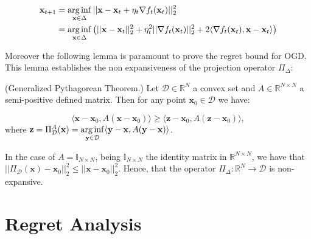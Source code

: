 \begin{align}
	\mathbf x_{t+1}&=\operatorname*{arg\,inf}\limits_{\mathbf x\in\Delta}||\mathbf x-\mathbf x_t+\eta_t\nabla f_t(\mathbf x_t)||_2^2\\
	&=\operatorname*{arg\,inf}\limits_{\mathbf x\in\Delta}\left(||\mathbf x-\mathbf x_t||_2^2+\eta_t^2||\nabla f_t(\mathbf x_t)||_2^2+2\langle\nabla f_t(\mathbf x_t),\mathbf x-\mathbf x_t\rangle\right)
\end{align}


Moreover the following lemma is paramount to prove the regret bound for OGD. This lemma establishes the non expansiveness of the projection operator $\Pi_\Delta$:

\begin{lemma}(Generalized Pythagorean Theorem.)\label{lemma:non_expansive}
Let $\mathcal D\in\mathbb R^N$ a convex set and $A\in\mathbb R^{N\times N}$ a semi-positive defined matrix. Then for any point $\mathbf x_0\in\mathcal D$ we have:

\begin{equation}
\langle\mathbf x-\mathbf x_0,A(\mathbf x-\mathbf x_0) \rangle\ge\langle\mathbf z-\mathbf x_0,A(\mathbf z-\mathbf x_0)\rangle,
\end{equation}
where $\mathbf z=\Pi_{\mathcal D}^A(\mathbf x)=\operatorname*{arg\,inf}\limits_{\mathbf y\in\mathcal D}\langle\mathbf y-\mathbf x,A(\mathbf y-\mathbf x)\rangle$.
\end{lemma}

In the case of $A=\mathbb I_{N\times N}$, being $\mathbb I_{N\times N}$ the identity matrix in $\mathbb R^{N\times N}$, we have that $||\Pi_\mathcal D(\mathbf x)-\mathbf x_0||_2^2\le||\mathbf x-\mathbf x_0||_2^2$. Hence, that the operator $\Pi_\Delta:\mathbb R^N\to\mathcal D$ is non-expansive.

\section{Regret Analysis}

